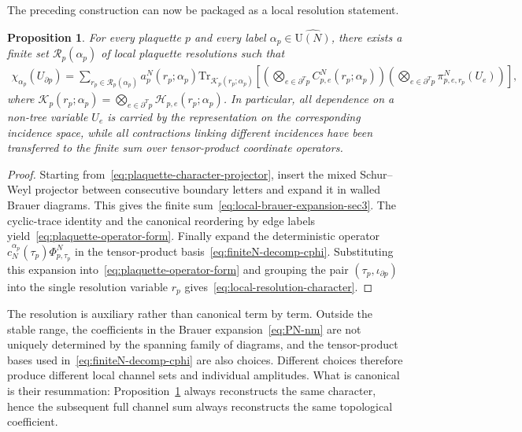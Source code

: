 \documentclass[11pt,a4paper,reqno]{article}
\newtheorem{proposition}[theorem]{Proposition}
\theoremstyle{definition}
\theoremstyle{remark}
\newcommand\U{{\mathrm U}}
\newcommand\Tr{\mathrm{Tr}}
\begin{document}
The preceding construction can now be packaged as a local resolution statement.

\begin{proposition}\label{prop:local-gauge-fixed-resolutions}
For every plaquette $p$ and every label $\alpha_p\in\widehat{\U(N)}$, there exists a finite set $\mathcal R_p(\alpha_p)$ of local plaquette resolutions such that
\begin{align}\label{eq:local-resolution-character}
\chi_{\alpha_p}(U_{\partial p})
=\sum_{r_p\in\mathcal R_p(\alpha_p)}a_p^N(r_p;\alpha_p)
\Tr_{\mathcal K_p(r_p;\alpha_p)}\!\left[
\left(\bigotimes_{e\in\partial^Tp}C^N_{p,e}(r_p;\alpha_p)\right)
\left(\bigotimes_{e\in\partial^Tp}\pi^N_{p,e,r_p}(U_e)\right)
\right],
\end{align}
where $\mathcal K_p(r_p;\alpha_p)=\bigotimes_{e\in\partial^Tp}\mathcal H_{p,e}(r_p;\alpha_p)$. In particular, all dependence on a non-tree variable $U_e$ is carried by the representation on the corresponding incidence space, while all contractions linking different incidences have been transferred to the finite sum over tensor-product coordinate operators.
\end{proposition}

\begin{proof}
Starting from~\eqref{eq:plaquette-character-projector}, insert the mixed Schur--Weyl projector between consecutive boundary letters and expand it in walled Brauer diagrams. This gives the finite sum~\eqref{eq:local-brauer-expansion-sec3}. The cyclic-trace identity and the canonical reordering by edge labels yield~\eqref{eq:plaquette-operator-form}. Finally expand the deterministic operator $c_N^{\alpha_p}(\tau_p)\Phi^N_{p,\tau_p}$ in the tensor-product basis~\eqref{eq:finiteN-decomp-cphi}. Substituting this expansion into~\eqref{eq:plaquette-operator-form} and grouping the pair $(\tau_p,\iota_{\partial p})$ into the single resolution variable $r_p$ gives~\eqref{eq:local-resolution-character}.
\end{proof}

The resolution is auxiliary rather than canonical term by term. Outside the stable range, the coefficients in the Brauer expansion~\eqref{eq:PN-nm} are not uniquely determined by the spanning family of diagrams, and the tensor-product bases used in~\eqref{eq:finiteN-decomp-cphi} are also choices. Different choices therefore produce different local channel sets and individual amplitudes. What is canonical is their resummation: Proposition~\ref{prop:local-gauge-fixed-resolutions} always reconstructs the same character, hence the subsequent full channel sum always reconstructs the same topological coefficient.
\end{document}

